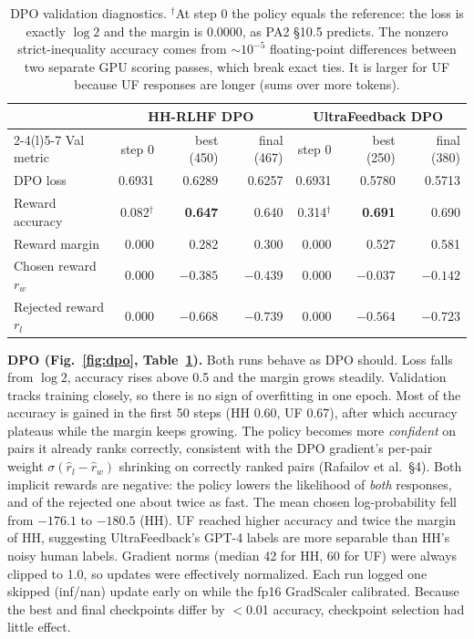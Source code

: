 \documentclass[10pt,a4paper]{article}
\begin{document}
\begin{table}[h]
\centering\footnotesize
\begin{tabular}{@{}lrrrrrr@{}}
\toprule
 & \multicolumn{3}{c}{HH-RLHF DPO} & \multicolumn{3}{c}{UltraFeedback DPO} \\
\cmidrule(lr){2-4}\cmidrule(l){5-7}
Val metric & step 0 & best (450) & final (467) & step 0 & best (250) & final (380) \\
\midrule
DPO loss & 0.6931 & 0.6289 & 0.6257 & 0.6931 & 0.5780 & 0.5713 \\
Reward accuracy & 0.082$^\dagger$ & \textbf{0.647} & 0.640 & 0.314$^\dagger$ & \textbf{0.691} & 0.690 \\
Reward margin & 0.000 & 0.282 & 0.300 & 0.000 & 0.527 & 0.581 \\
Chosen reward $r_w$ & 0.000 & $-0.385$ & $-0.439$ & 0.000 & $-0.037$ & $-0.142$ \\
Rejected reward $r_l$ & 0.000 & $-0.668$ & $-0.739$ & 0.000 & $-0.564$ & $-0.723$ \\
\bottomrule
\end{tabular}
\caption{DPO validation diagnostics. $^\dagger$At step 0 the policy equals the reference: the loss is exactly $\log 2$ and the margin is 0.0000, as PA2 \S10.5 predicts. The nonzero strict-inequality accuracy comes from ${\sim}10^{-5}$ floating-point differences between two separate GPU scoring passes, which break exact ties. It is larger for UF because UF responses are longer (sums over more tokens).}
\label{tab:dpo}
\end{table}

\textbf{DPO (Fig.~\ref{fig:dpo}, Table~\ref{tab:dpo}).} Both runs behave as DPO should. Loss falls from $\log 2$, accuracy rises above 0.5 and the margin grows steadily. Validation tracks training closely, so there is no sign of overfitting in one epoch. Most of the accuracy is gained in the first 50 steps (HH 0.60, UF 0.67), after which accuracy plateaus while the margin keeps growing. The policy becomes more \emph{confident} on pairs it already ranks correctly, consistent with the DPO gradient's per-pair weight $\sigma(\hat r_l-\hat r_w)$ shrinking on correctly ranked pairs (Rafailov et al.\ \S4). Both implicit rewards are negative: the policy lowers the likelihood of \emph{both} responses, and of the rejected one about twice as fast. The mean chosen log-probability fell from $-176.1$ to $-180.5$ (HH). UF reached higher accuracy and twice the margin of HH, suggesting UltraFeedback's GPT-4 labels are more separable than HH's noisy human labels. Gradient norms (median 42 for HH, 60 for UF) were always clipped to 1.0, so updates were effectively normalized. Each run logged one skipped (inf/nan) update early on while the fp16 GradScaler calibrated. Because the best and final checkpoints differ by $<$0.01 accuracy, checkpoint selection had little effect.
\end{document}
